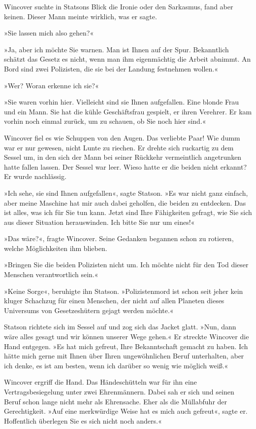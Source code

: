 Wincover suchte in Statsons Blick die Ironie oder den Sarkasmus,
fand aber keinen. Dieser Mann meinte wirklich, was er sagte.

»Sie lassen mich also gehen?«

»Ja, aber ich möchte Sie warnen. Man ist Ihnen auf der Spur.
Bekanntlich schätzt das Gesetz es nicht, wenn man ihm eigenmächtig
die Arbeit abnimmt. An Bord sind zwei Polizisten, die sie bei der
Landung festnehmen wollen.«

»Wer? Woran erkenne ich sie?«

»Sie waren vorhin hier. Vielleicht sind sie Ihnen aufgefallen. Eine
blonde Frau und ein Mann. Sie hat die kühle Geschäftsfrau gespielt,
er ihren Verehrer. Er kam vorhin noch einmal zurück, um zu schauen,
ob Sie noch hier sind.«

Wincover fiel es wie Schuppen von den Augen. Das verliebte Paar!
Wie dumm war er nur gewesen, nicht Lunte zu riechen. Er drehte sich
ruckartig zu dem Sessel um, in den sich der Mann bei seiner
Rückkehr vermeintlich angetrunken hatte fallen lassen. Der Sessel
war leer. Wieso hatte er die beiden nicht erkannt? Er wurde
nachlässig.

»Ich sehe, sie sind Ihnen aufgefallen«, sagte Statson. »Es war
nicht ganz einfach, aber meine Maschine hat mir auch dabei
geholfen, die beiden zu entdecken. Das ist alles, was ich für Sie
tun kann. Jetzt sind Ihre Fähigkeiten gefragt, wie Sie sich aus
dieser Situation herauswinden. Ich bitte Sie nur um eines!«

»Das wäre?«, fragte Wincover. Seine Gedanken begannen schon zu
rotieren, welche Möglichkeiten ihm blieben.

»Bringen Sie die beiden Polizisten nicht um. Ich möchte nicht für
den Tod dieser Menschen verantwortlich sein.«

»Keine Sorge«, beruhigte ihn Statson. »Polizistenmord ist schon
seit jeher kein kluger Schachzug für einen Menschen, der nicht auf
allen Planeten dieses Universums von Gesetzeshütern gejagt werden
möchte.«

\bigpar

Statson richtete sich im Sessel auf und zog sich das Jacket glatt.
»Nun, dann wäre alles gesagt und wir können unserer Wege gehen.« Er
streckte Wincover die Hand entgegen. »Es hat mich gefreut, Ihre
Bekanntschaft gemacht zu haben. Ich hätte mich gerne mit Ihnen über
Ihren ungewöhnlichen Beruf unterhalten, aber ich denke, es ist am
besten, wenn ich darüber so wenig wie möglich weiß.«

Wincover ergriff die Hand. Das Händeschütteln war für ihn eine
Vertragsbesiegelung unter zwei Ehrenmännern. Dabei sah er sich und
seinen Beruf schon lange nicht mehr als Ehrensache. Eher als die
Müllabfuhr der Gerechtigkeit. »Auf eine merkwürdige Weise hat es
mich auch gefreut«, sagte er. Hoffentlich überlegen Sie es sich
nicht noch anders.«

